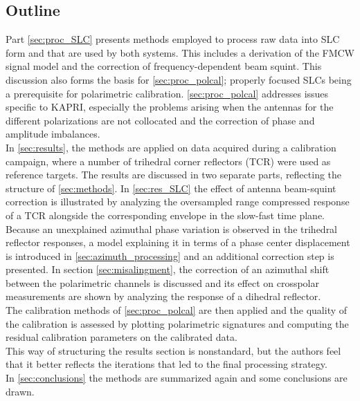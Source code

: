 \subsection{Outline}
Part \ref{sec:proc_SLC} presents  methods employed to process raw data into SLC form and that are used by both systems. This includes a derivation of the FMCW signal model and the correction of frequency-dependent beam squint. This discussion also forms the basis for \ref{sec:proc_polcal}; properly focused SLCs being a prerequisite for polarimetric calibration.  \ref{sec:proc_polcal} addresses issues specific to KAPRI, especially the problems arising when the antennas for the different polarizations are not collocated and the correction of phase and amplitude imbalances.\\
In \autoref{sec:results}, the methods are applied on data acquired during a calibration campaign, where a number of trihedral corner reflectors (TCR) were used as reference targets. The results are discussed in two separate parts, reflecting the structure of \autoref{sec:methods}. In \autoref{sec:res_SLC} the effect of antenna beam-squint correction is illustrated by analyzing the oversampled range compressed response of a TCR alongside the corresponding envelope in the slow-fast time plane. Because an unexplained azimuthal phase variation is observed in the trihedral reflector responses, a model explaining it in terms of a phase center displacement is introduced in \autoref{sec:azimuth_processing} and an additional correction step is presented. In section \ref{sec:misalingment}, the correction of an azimuthal shift between the polarimetric channels is discussed and its effect on crosspolar measurements are shown by analyzing the response of a dihedral reflector.\\
The calibration methods of \ref{sec:proc_polcal} are then applied  and the quality of the calibration is assessed by plotting polarimetric signatures and computing the residual calibration parameters on the calibrated data.\\ 
This way of structuring the results section is nonstandard, but the authors feel that it better reflects the iterations that led to the final processing strategy.\\
In \autoref{sec:conclusions} the methods are summarized again and some conclusions are drawn.